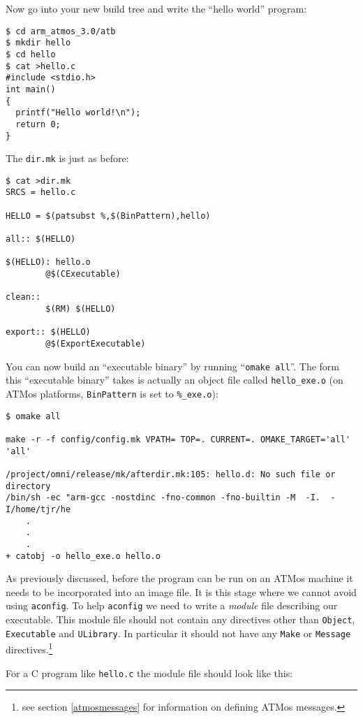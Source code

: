 \documentclass[11pt,twoside,onecolumn]{article}
\begin{document}
Now go into your new build tree and write the ``hello world'' program:

{\footnotesize \begin{verbatim}
$ cd arm_atmos_3.0/atb 
$ mkdir hello
$ cd hello
$ cat >hello.c
#include <stdio.h>
int main()
{
  printf("Hello world!\n");
  return 0;
}
\end{verbatim}}

The {\tt dir.mk} is just as before:

{\footnotesize \begin{verbatim}
$ cat >dir.mk
SRCS = hello.c

HELLO = $(patsubst %,$(BinPattern),hello)

all:: $(HELLO)

$(HELLO): hello.o
        @$(CExecutable)

clean::
        $(RM) $(HELLO)

export:: $(HELLO)
        @$(ExportExecutable)
\end{verbatim}}

You can now build an ``executable binary'' by running ``{\tt omake all}''.  The
form this ``executable binary'' takes is actually an object file called
\verb|hello_exe.o| (on ATMos platforms, {\tt BinPattern} is set to
\verb|%_exe.o|):

{\footnotesize \begin{verbatim}
$ omake all

make -r -f config/config.mk VPATH= TOP=. CURRENT=. OMAKE_TARGET='all' 'all'

/project/omni/release/mk/afterdir.mk:105: hello.d: No such file or directory
/bin/sh -ec "arm-gcc -nostdinc -fno-common -fno-builtin -M  -I.  -I/home/tjr/he
    .
    .
    .
+ catobj -o hello_exe.o hello.o 
\end{verbatim}}

As previously discussed, before the program can be run on an ATMos machine it
needs to be incorporated into an image file.  It is this stage where we cannot
avoid using {\tt aconfig}.  To help {\tt aconfig} we need to write a {\em
module} file describing our executable.  This module file should not contain
any directives other than {\tt Object}, {\tt Executable} and {\tt ULibrary}.
In particular it should not have any {\tt Make} or {\tt Message}
directives.\footnote{see section \ref{atmosmessages} for information on
defining ATMos messages.}

For a C program like {\tt hello.c} the module file should look like this:
\end{document}
